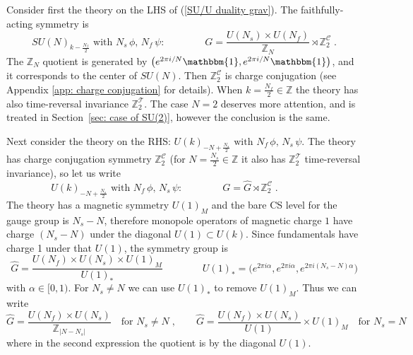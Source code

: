 \documentclass[a4paper, 12pt]{article}
\newcommand{\wh}{\widehat}
\numberwithin{equation}{section}
\newcommand{\be}{\begin{equation}} \newcommand{\ee}{\end{equation}}
\newcommand{\cC}{\mathcal{C}}
\newcommand{\cT}{\mathcal{T}}
\newcommand{\bZ}{\mathbb{Z}}
\newcommand{\unit}{\mathbbm{1}}
\begin{document}
Consider first the theory on the LHS of (\ref{SU/U duality grav}). The faithfully-acting symmetry is
\be
\label{faithful symmetry LHS}
SU(N)_{k - \frac{N_f}2} \text{ with } N_s\, \phi,\, N_f\, \psi : \qquad\qquad G = \frac{U(N_s) \times U(N_f)}{\bZ_N} \rtimes \bZ_2^\cC \;.
\ee
The $\bZ_N$ quotient is generated by $\big( e^{2\pi i /N} \unit, e^{2\pi i /N} \unit \big)$, and it corresponds to the center of $SU(N)$. Then $\bZ_2^\cC$ is charge conjugation (see Appendix \ref{app: charge conjugation} for details). When $k = \frac{N_f}2 \in \bZ$ the theory has also time-reversal invariance $\bZ_2^\cT$. The case $N=2$ deserves more attention, and is treated in Section~\ref{sec: case of SU(2)}, however the conclusion is the same.

Next consider the theory on the RHS: $U(k)_{-N + \frac{N_s}2} \text{ with } N_f\, \phi,\, N_s\, \psi$. The theory has charge conjugation symmetry $\bZ_2^\cC$ (for $N = \frac{N_s}2 \in \bZ$ it also has $\bZ_2^\cT$ time-reversal invariance), so let us write
\be
U(k)_{-N + \frac{N_s}2} \text{ with } N_f\, \phi,\, N_s\, \psi: \qquad\qquad G = \wh G \rtimes \bZ_2^\cC \;. \qquad\qquad
\ee
The theory has a magnetic symmetry $U(1)_M$ and the bare CS level for the gauge group is $N_s - N$, therefore monopole operators of magnetic charge $1$ have charge $(N_s - N)$ under the diagonal $U(1) \subset U(k)$. Since fundamentals have charge 1 under that $U(1)$, the symmetry group is
\be
\label{symmetry RHS}
\wh G = \frac{U(N_f) \times U(N_s) \times U(1)_M}{U(1)_*} \qquad\qquad U(1)_* = \big( e^{2\pi i \alpha}, e^{2\pi i \alpha}, e^{2\pi i (N_s-N)\alpha} \big)
\ee
with $\alpha \in [0,1)$. For $N_s \neq N$ we can use $U(1)_*$ to remove $U(1)_M$. Thus we can write
\be
\wh G = \frac{U(N_f) \times U(N_s)}{\bZ_{| N-N_s |}} \quad\text{for } N_s \neq N \;,\qquad \wh G = \frac{U(N_f) \times U(N_s)}{U(1)} \times U(1)_M \quad\text{for } N_s = N
\ee
where in the second expression the quotient is by the diagonal $U(1)$.
\end{document}
